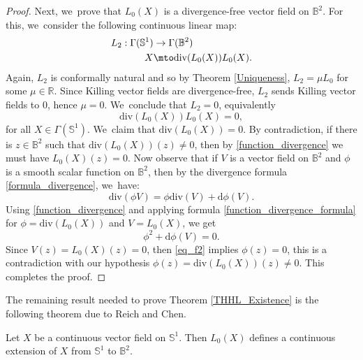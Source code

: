 \begin{proof}
Next, we~prove that $L_0(X)$ is a divergence-free vector field on $\mathbb{B}^2$. For this, we~consider the following continuous linear map:
\[
\begin{aligned}
L_2:\Gamma(\mathbb{S}^1) & \to \Gamma(\mathbb{B}^2) \\
X & \mto \mathrm{div}(L_0(X))L_0(X).
\end{aligned}
\]
Again, $L_2$ is conformally natural and so by Theorem \ref{Uniqueness}, $L_2=\mu L_0$ for some $\mu\in\mathbb{R}$. Since Killing vector fields are divergence-free, $L_2$ sends Killing vector fields to $0$, hence $\mu=0$. We~conclude that $L_2=0$, equivalently \begin{equation}\label{function_divergence}
\mathrm{div}(L_0(X))L_0(X)=0,
\end{equation} for all $X\in\Gamma(\mathbb{S}^1)$. We~claim that $\mathrm{div}(L_0(X))=0$. By contradiction, if there is $z\in\mathbb{B}^2$ such that $\mathrm{div}(L_0(X))(z)\neq0$, then by \eqref{function_divergence} we must have $L_0(X)(z)=0$. Now observe that if $V$ is a vector field on $\mathbb{B}^2$ and $\phi$ is a smooth scalar function on $\mathbb{B}^2$, then by the divergence formula \eqref{formula_divergence}, we~have:
\begin{equation}\label{function_divergence_formula}
\mathrm{div}(\phi V)=\phi\mathrm{div}(V)+\mathrm{d}\phi(V).
\end{equation}
Using \eqref{function_divergence} and applying formula \eqref{function_divergence_formula} for $\phi=\mathrm{div}(L_0(X))$ and $V=L_0(X)$, we get
\begin{equation}\label{eq_f2}
\phi^2+\mathrm{d}\phi(V)=0.
\end{equation} Since $V(z)=L_0(X)(z)=0$, then \eqref{eq_f2} implies $\phi(z)=0$, this is a contradiction with our hypothesis $\phi(z)=\mathrm{div}(L_0(X))(z)\neq 0$. This completes the proof.
\end{proof}
The remaining result needed to prove Theorem \ref{THHL_Existence} is the following theorem due to Reich and Chen.
\begin{theorem}\label{extension_Reich}
Let $X$ be a continuous vector field on $\mathbb{S}^1$. Then $L_0(X)$ defines a continuous extension of $X$ from $\mathbb{S}^1$ to $\mathbb{B}^2$.
\end{theorem}

